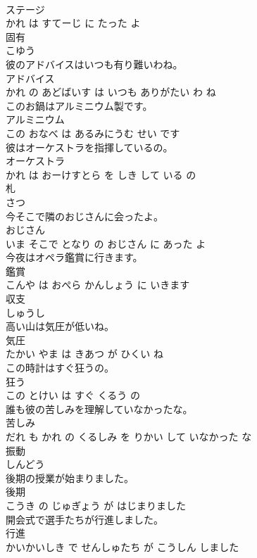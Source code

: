 \documentclass[8pt]{extreport}
\begin{document}
\begin{CJK}{UTF8}{min}
\\	ステージ 
\\	かれ は すてーじ に たった よ			
\\	固有	
\\	こゆう			
\\	彼のアドバイスはいつも有り難いわね。	
\\	アドバイス 
\\	かれ の あどばいす は いつも ありがたい わ ね			
\\	このお鍋はアルミニウム製です。	
\\	アルミニウム 
\\	この おなべ は あるみにうむ せい です			
\\	彼はオーケストラを指揮しているの。	
\\	オーケストラ 
\\	かれ は おーけすとら を しき して いる の			
\\	札	
\\	さつ			
\\	今そこで隣のおじさんに会ったよ。	
\\	おじさん 
\\	いま そこで となり の おじさん に あった よ			
\\	今夜はオペラ鑑賞に行きます。	
\\	鑑賞 
\\	こんや は おぺら かんしょう に いきます			
\\	収支	
\\	しゅうし			
\\	高い山は気圧が低いね。	
\\	気圧 
\\	たかい やま は きあつ が ひくい ね			
\\	この時計はすぐ狂うの。	
\\	狂う 
\\	この とけい は すぐ くるう の			
\\	誰も彼の苦しみを理解していなかったな。	
\\	苦しみ 
\\	だれ も かれ の くるしみ を りかい して いなかった な			
\\	振動	
\\	しんどう			
\\	後期の授業が始まりました。	
\\	後期 
\\	こうき の じゅぎょう が はじまりました			
\\	開会式で選手たちが行進しました。	
\\	行進 
\\	かいかいしき で せんしゅたち が こうしん しました			

\end{CJK}
\end{document}
